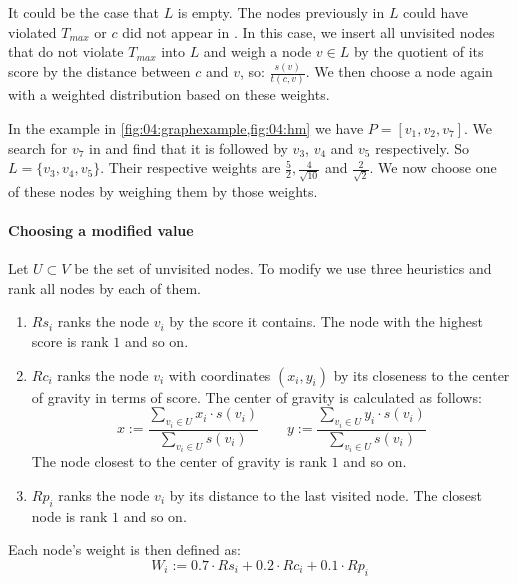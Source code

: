 It could be the case that $L$ is empty. The nodes previously in $L$ could have violated $T_{max}$ or $c$ did not appear in \hm{}.
In this case, we insert all unvisited nodes that do not violate $T_{max}$ into $L$ and weigh a node $v \in L$ by the quotient of its score by the distance between $c$ and $v$, so: $\tfrac{s(v)}{t(c, v)}$.
We then choose a node again with a weighted distribution based on these weights.

In the example in \cref{fig:04:graphexample,fig:04:hm} we have $P = [v_1, v_2, v_7]$.
We search for $v_7$ in \hm{} and find that it is followed by $v_3$, $v_4$ and $v_5$ respectively.
So $L = \{v_3, v_4, v_5\}$. Their respective weights are $\tfrac{5}{2}, \tfrac{4}{\sqrt{10}}$ and $\tfrac{2}{\sqrt{2}}$.
We now choose one of these nodes by weighing them by those weights.

\label{par:04:choosemodified}
\paragraph{Choosing a modified value}

Let $U \subset V$ be the set of unvisited nodes.
To modify we use three heuristics and rank all nodes by each of them.

\begin{enumerate}
	\item $Rs_i$ ranks the node $v_i$ by the score it contains. The node with the highest score is rank $1$ and so on.
	\item $Rc_i$ ranks the node $v_i$ with coordinates $(x_i, y_i)$ by its closeness to the center of gravity in terms of score. The center of gravity is calculated as follows:
	      \begin{equation*}
		      x := \frac{\sum_{v_i \in U} x_i \cdot s(v_i)}{\sum_{v_i \in U} s(v_i)}\quad\quad
		      y := \frac{\sum_{v_i \in U} y_i \cdot s(v_i)}{\sum_{v_i \in U} s(v_i)}
	      \end{equation*}
	      The node closest to the center of gravity is rank $1$ and so on.
	\item $Rp_i$ ranks the node $v_i$ by its distance to the last visited node.
	      The closest node is rank $1$ and so on.
\end{enumerate}

Each node's weight is then defined as:
\begin{equation*}
	W_i := 0.7 \cdot Rs_i + 0.2 \cdot Rc_i + 0.1 \cdot Rp_i
\end{equation*}

